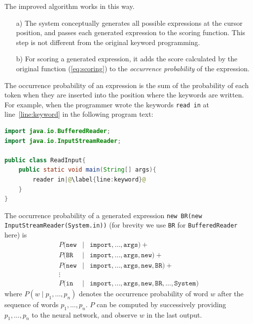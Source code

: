 \documentclass[PRO,english]{ipsj}
\begin{document}
The improved algorithm works in this way.
\begin{enumerate}
\item[a)] The system conceptually generates all possible expressions at the cursor position, and passes each generated expression to the scoring function.  This step is not different from the original keyword programming.
\item[b)] For scoring a generated expression, it adds the score calculated by the original function (\ref{eq:scoring}) to the \emph{occurrence probability} of the expression.
\end{enumerate}
The occurrence probability of an expression is the sum of the probability of each token when they are inserted into the position where the keywords are written.  For example, when the programmer wrote the keywords \texttt{read in} at line~\ref{line:keyword} in the following program text:
\begin{lstlisting}[language=Java,escapechar=@]
import java.io.BufferedReader;
import java.io.InputStreamReader;

public class ReadInput{
    public static void main(String[] args){
        reader in|@\label{line:keyword}@
    }
}
\end{lstlisting}
The occurrence probability of a generated expression \texttt{new BR(new InputStreamReader(System.in))} (for brevity we use \texttt{BR} for \texttt{BufferedReader} here) is
\begin{eqnarray*}
  P( \mathtt{new} &\mid& \mathtt{import},\ldots,\mathtt{args}) + \\
  P( \mathtt{BR} &\mid& \mathtt{import},\ldots,\mathtt{args}, \mathtt{new}) +\\
  P( \mathtt{new} &\mid& \mathtt{import},\ldots,\mathtt{args},\mathtt{new},\mathtt{BR}) +\\
  \vdots\\
  P( \mathtt{in} &\mid& \mathtt{import},\ldots,\mathtt{args},\mathtt{new},\mathtt{BR},\ldots,\mathtt{System})
\end{eqnarray*}
where $P(w \mid p_1,\ldots,p_n)$ denotes the occurrence probability of word $w$ after the sequence of words $p_1, \ldots, p_n$.  $P$ can be computed by successively providing $p_1, \ldots, p_n$ to the neural network, and observe $w$ in the last output.


\end{document}

